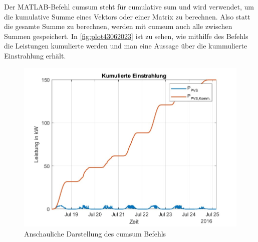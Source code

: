 Der MATLAB-Befehl cumsum steht für cumulative sum und wird verwendet, um die kumulative Summe eines Vektors oder einer Matrix zu berechnen. 
Also statt die gesamte Summe zu berechnen, werden mit cumsum auch alle zwischen Summen gespeichert. In \autoref{fig:plot43062023} ist zu sehen, wie mithilfe des Befehls die Leistungen kumulierte werden und man eine Aussage über die kummulierte Einstrahlung erhält.
\begin{figure}[H]
    \centering
    \includegraphics[width=\textwidth]{Abbildungen/plot_vorbereitungsfrage4.jpg}
    \caption{Anschauliche Darstellung des cumsum Befehls}
    \label{fig:plot43062023}
\end{figure}